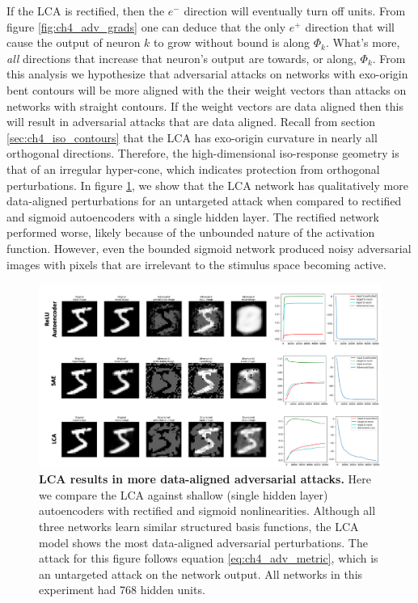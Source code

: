 If the LCA is rectified, then the $e^{-}$ direction will eventually turn off units.
From figure \ref{fig:ch4_adv_grads} one can deduce that the only $e^{+}$ direction that will cause the output of neuron $k$ to grow without bound is along $\Phi_{k}$.
What's more, \emph{all} directions that increase that neuron's output are towards, or along, $\Phi_{k}$.
From this analysis we hypothesize that adversarial attacks on networks with exo-origin bent contours will be more aligned with the their weight vectors than attacks on networks with straight contours.
If the weight vectors are data aligned then this will result in adversarial attacks that are data aligned.
Recall from section \ref{sec:ch4_iso_contours} that the LCA has exo-origin curvature in nearly all orthogonal directions.
Therefore, the high-dimensional iso-response geometry is that of an irregular hyper-cone, which indicates protection from orthogonal perturbations.
In figure \ref{fig:ch4_marzi_network_attack}, we show that the LCA network has qualitatively more data-aligned perturbations for an untargeted attack when compared to rectified and sigmoid autoencoders with a single hidden layer.
The rectified network performed worse, likely because of the unbounded nature of the activation function.
However, even the bounded sigmoid network produced noisy adversarial images with pixels that are irrelevant to the stimulus space becoming active.

\begin{figure}[h]
    \centering
    \includegraphics[width=\textwidth]{figures/adv_network_marzi_lca_sae_relu.png}
    \caption{\textbf{LCA results in more data-aligned adversarial attacks.} Here we compare the LCA against shallow (single hidden layer) autoencoders with rectified and sigmoid nonlinearities. Although all three networks learn similar structured basis functions, the LCA model shows the most data-aligned adversarial perturbations. The attack for this figure follows equation \eqref{eq:ch4_adv_metric}, which is an untargeted attack on the network output. All networks in this experiment had 768 hidden units.}
    \label{fig:ch4_marzi_network_attack}
\end{figure}



